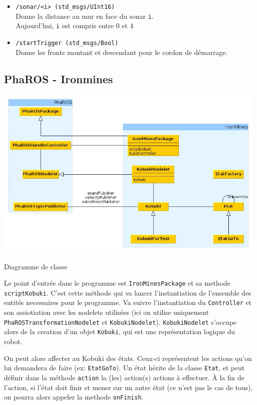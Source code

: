 \documentclass[a4paper, 11pt]{article}
\begin{document}
\begin{itemize}
\item \texttt{/sonar/<i> (std\_msgs/UInt16)}\\
  Donne la distance au mur en face du sonar \texttt{i}.\\
  Aujourd'hui, \texttt{i} est compris entre 0 et 4
\item \texttt{/startTrigger (std\_msgs/Bool)}\\ 
  Donne les fronts montant et descendant pour le cordon de démarrage.
\end{itemize}

\subsection{PhaROS - Ironmines}

\begin{center}
  \includegraphics[width=\linewidth]{./UMLClass.jpg}
  \caption{Diagramme de classe}
  \label{dia_class}
\end{center}

Le point d'entrée dans le programme est \texttt{IronMinesPackage} et
sa methode \texttt{scriptKobuki}. C'est cette méthode qui va lancer
l'instantiation de l'ensemble des entités necessaires pour le
programme. Va suivre l'instantiation du \texttt{Controller} et son
assiotiation avec les nodelets utilisées (ici on utilise uniquement
\texttt{PhaROSTransformationNodelet} et
\texttt{KobukiNodelet}). \texttt{KobukiNodelet} s'occupe alors de la
creation d'un objet \texttt{Kobuki}, qui est une représentation
logique du robot.

On peut alors affecter au Kobuki des états. Ceux-ci représentent les
actions qu'on lui demandera de faire (ex: \texttt{EtatGoTo}). Un état
hérite de la classe \texttt{Etat}, et peut définir dans la méthode
\texttt{action} la (les) action(s) actions à effectuer. À la fin de
l'action, si l'état doit finir et mener sur un autre état (ce n'est
pas le cas de tous), on pourra alors appeler la methode
\texttt{onFinish}. 
\end{document}
